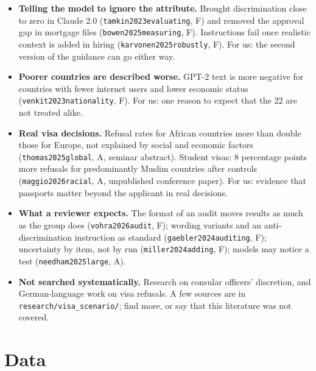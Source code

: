 \documentclass[11pt]{article}
\begin{document}
{\begin{itemize}
  \item \textbf{Telling the model to ignore the attribute.} Brought discrimination close
        to zero in Claude 2.0 (\texttt{tamkin2023evaluating}, F) and removed the
        approval gap in mortgage files (\texttt{bowen2025measuring}, F). Instructions
        fail once realistic context is added in hiring (\texttt{karvonen2025robustly},
        F). For us: the second version of the guidance can go either way.
  \item \textbf{Poorer countries are described worse.} GPT-2 text is more negative for
        countries with fewer internet users and lower economic status
        (\texttt{venkit2023nationality}, F). For us: one reason to expect that the 22
        are not treated alike.
  \item \textbf{Real visa decisions.} Refusal rates for African countries more than
        double those for Europe, not explained by social and economic factors
        (\texttt{thomas2025global}, A, seminar abstract). Student visas: 8 percentage
        points more refusals for predominantly Muslim countries after controls
        (\texttt{maggio2026racial}, A, unpublished conference paper). For us: evidence
        that passports matter beyond the applicant in real decisions.
  \item \textbf{What a reviewer expects.} The format of an audit moves results as much
        as the group does (\texttt{vohra2026audit}, F); wording variants and an
        anti-discrimination instruction as standard (\texttt{gaebler2024auditing}, F);
        uncertainty by item, not by run (\texttt{miller2024adding}, F); models may
        notice a test (\texttt{needham2025large}, A).
  \item \textbf{Not searched systematically.} Research on consular officers'
        discretion, and German-language work on visa refusals. A few sources are in
        \texttt{research/visa\_scenario/}; find more, or say that this literature was
        not covered.
\end{itemize}}

\section{Data}
\label{sec:data}
\end{document}
